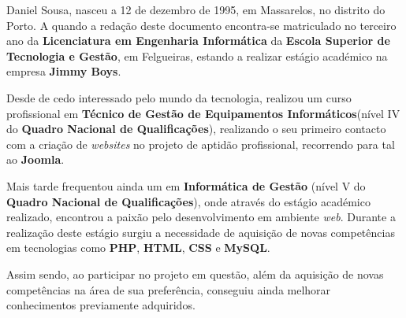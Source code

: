 
Daniel Sousa, nasceu a 12 de dezembro de 1995, em Massarelos, no distrito do Porto. A quando a redação deste documento encontra-se matriculado no terceiro ano da \textbf{Licenciatura em Engenharia Informática} da \textbf{Escola Superior de Tecnologia e Gestão}, em Felgueiras, estando a realizar estágio académico na empresa \textbf{Jimmy Boys}.

Desde de cedo interessado pelo mundo da tecnologia, realizou um curso profissional em \textbf{Técnico de Gestão de Equipamentos Informáticos}(nível IV do \textbf{Quadro Nacional de Qualificações}), realizando o seu primeiro contacto com a criação de \textit{websites} no projeto de aptidão profissional, recorrendo para tal ao  \textbf{Joomla}.

Mais tarde frequentou ainda um \textbf{} em \textbf{Informática de Gestão} (nível V do \textbf{Quadro Nacional de Qualificações}), onde através do estágio académico realizado, encontrou a paixão pelo desenvolvimento em ambiente \textit{web}. Durante a realização deste estágio surgiu a necessidade de aquisição de novas competências em tecnologias como \textbf{PHP}, \textbf{HTML}, \textbf{CSS} e \textbf{MySQL}.

Assim sendo, ao participar no projeto em questão, além da aquisição de novas competências na área de sua preferência, conseguiu ainda melhorar conhecimentos previamente adquiridos. %